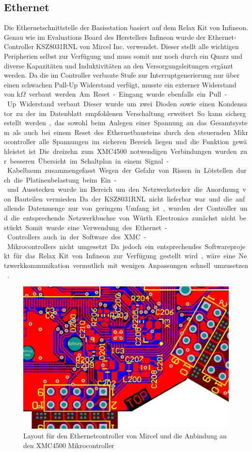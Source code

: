 \subsection{Ethernet}
Die Ethernetschnittstelle der Basisstation basiert auf dem  Relax Kit von Infineon. Genau wie im Evaluations Board des Herstellers Infineon wurde der Ethernet-Controller KSZ8031RNL von Mircel Inc. verwendet. Dieser stellt alle wichtigen Peripherien selbst zur Verfügung und muss somit nur noch durch ein Quarz und diverse Kapazitäten und Induktivitäten an den Versorgungsleitungen ergänzt werden. Da die im Controller verbaute Stufe zur Interruptgenerierung nur über einen schwachen Pull-Up Widerstand verfügt, musste ein externer Widerstand von \unit[1]{k$\Omega$} verbaut werden. Am Reset-Eingang wurde ebenfalls ein Pull-Up Widerstand verbaut. Dieser wurde um zwei Dioden sowie einen Kondensator zu der im Datenblatt empfohlenen Verschaltung erweitert. So kann sichergestellt werden, das sowohl beim Anlegen einer Spannung an das Gesamtsystem als auch bei einem Reset des Ethernetbausteins durch den steuernden Mikrocontroller alle Spannungen im sicheren Bereich liegen und die Funktion gewähleistet ist. Die dreizehn zum XMC4500 notwendigen Verbindungen wurden zur besseren Übersicht im Schaltplan in einem Signal-Kabelbaum zusammengefasst. Wegen der Gefahr von Rissen in Lötstellen durch die Platinenbelastung beim Ein- und Ausstecken wurde im Bereich um den Netzwerkstecker die Anordnung von Bauteilen vermieden. 
Da der KSZ8031RNL  nicht lieferbar war und die anfallende Datenmenge nur von geringem Umfang ist, wurden der Controller und die entsprechende Netzwerkbuchse von Würth Electronics zunächst nicht bestückt. Somit wurde eine Verwendung des Ethernet-Controllers auch in der Software des XMC-Mikrocontrollers nicht umgesetzt. Da jedoch ein entsprechendes Softwareprojekt für das Relax Kit von Infineon zur Verfügung gestellt  wird, wäre eine Netzwerkkommunikation vermutlich mit wenigen Anpassungen schnell umzusetzen \cite{DAVE-3-Example-}. 
\begin{figure}[h]
\centering
\includegraphics[width=0.7\linewidth]{Abbildungen/Aufnahmen/Bilder/Altium/Ethernet}
\caption{Layout für den Ethernetcontroller von Mircel und die Anbindung an den XMC4500 Mikrocontroller}
\label{fig:ethernet}
\end{figure}








